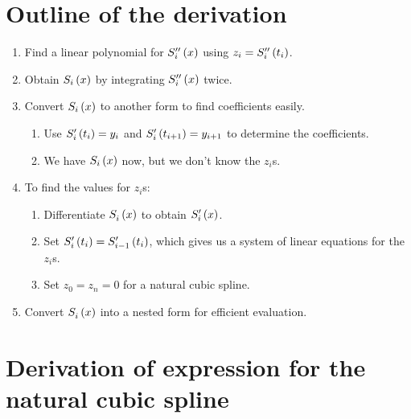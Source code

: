 \documentclass[letterpaper, 10pt, titlepage]{article}
\newcommand{\primed}[1]{^{
    \ifthenelse
    {
        \equal{#1}{0}
    }
    {
    }
    {
        \foreach \x in {1,...,#1}{\prime}}
    }
}
\newcommand{\fs}[3]{\functionof{S_{#1}\primed{#2}}{#3}}
\begin{document}
\section{Outline of the derivation}
\begin{enumerate}
    \item Find a linear polynomial for $\functionof{S_i\primed{2}}{x}$ using
        $z_i = \functionof{S_i\primed{2}}{t_i}$.
    \item Obtain $S_i\left(x\right)$ by integrating
        $\functionof{S_i\primed{2}}{x}$ twice.
    \item Convert $S_i\left(x\right)$ to another form to find coefficients
            easily.
        \begin{enumerate}
            \item Use $\functionof{S_i\primed{1}}{t_i} = y_i$ and
                $\functionof{S_i\primed{1}}{t_{i+1}} = y_{i+1}$ to determine the
                coefficients.
            \item We have $S_i\left(x\right)$ now, but we don't know the $z_i$s.
        \end{enumerate}
    \item To find the values for $z_i$s:
        \begin{enumerate}
            \item Differentiate $\fs{i}{0}{x}$ to obtain $\fs{i}{1}{x}$.
            \item Set $\fs{i}{1}{t_i} = \fs{i-1}{1}{t_i}$, which gives us a
                system of linear equations for the $z_i$s.
            \item Set $z_0 = z_n = 0$ for a natural cubic spline.
        \end{enumerate}
    \item Convert $\fs{i}{0}{x}$ into a nested form for efficient evaluation.
\end{enumerate}

\section{Derivation of expression for the natural cubic spline}
\end{document}
